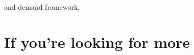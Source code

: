\begin{enumerate}
%
%
%
 and demand framework,
%
%
%
%
%
%
\end{enumerate}
\setlength{\leftmargini}{\oldleftmargini}

\section*{If you're looking for more}

